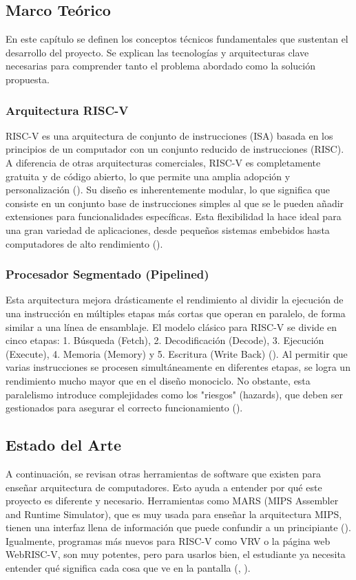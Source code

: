 \documentclass[12pt, letterpaper]{article}
\begin{document}
\subsection{Marco Teórico}
En este capítulo se definen los conceptos técnicos fundamentales que sustentan el desarrollo del proyecto. Se explican las tecnologías y arquitecturas clave necesarias para comprender tanto el problema abordado como la solución propuesta.

\subsubsection{Arquitectura RISC-V}
RISC-V es una arquitectura de conjunto de instrucciones (ISA) basada en los principios de un computador con un conjunto reducido de instrucciones (RISC). A diferencia de otras arquitecturas comerciales, RISC-V es completamente gratuita y de código abierto, lo que permite una amplia adopción y personalización (\cite{poojary2025}). Su diseño es inherentemente modular, lo que significa que consiste en un conjunto base de instrucciones simples al que se le pueden añadir extensiones para funcionalidades específicas. Esta flexibilidad la hace ideal para una gran variedad de aplicaciones, desde pequeños sistemas embebidos hasta computadores de alto rendimiento (\cite{mallidu2023}).

\subsubsection{Procesador Segmentado (Pipelined)}
Esta arquitectura mejora drásticamente el rendimiento al dividir la ejecución de una instrucción en múltiples etapas más cortas que operan en paralelo, de forma similar a una línea de ensamblaje. El modelo clásico para RISC-V se divide en cinco etapas: 1. Búsqueda (Fetch), 2. Decodificación (Decode), 3. Ejecución (Execute), 4. Memoria (Memory) y 5. Escritura (Write Back) (\cite{khairullah2022}). Al permitir que varias instrucciones se procesen simultáneamente en diferentes etapas, se logra un rendimiento mucho mayor que en el diseño monociclo. No obstante, esta paralelismo introduce complejidades como los "riesgos" (hazards), que deben ser gestionados para asegurar el correcto funcionamiento (\cite{ihtemam2024}).

\subsection{Estado del Arte}
A continuación, se revisan otras herramientas de software que existen para enseñar arquitectura de computadores. Esto ayuda a entender por qué este proyecto es diferente y necesario. Herramientas como MARS (MIPS Assembler and Runtime Simulator), que es muy usada para enseñar la arquitectura MIPS, tienen una interfaz llena de información que puede confundir a un principiante (\cite{vollmar2007}). Igualmente, programas más nuevos para RISC-V como VRV o la página web WebRISC-V, son muy potentes, pero para usarlos bien, el estudiante ya necesita entender qué significa cada cosa que ve en la pantalla (\cite{giorgi2019}, \cite{krim2025}).


\newpage

\end{document}
